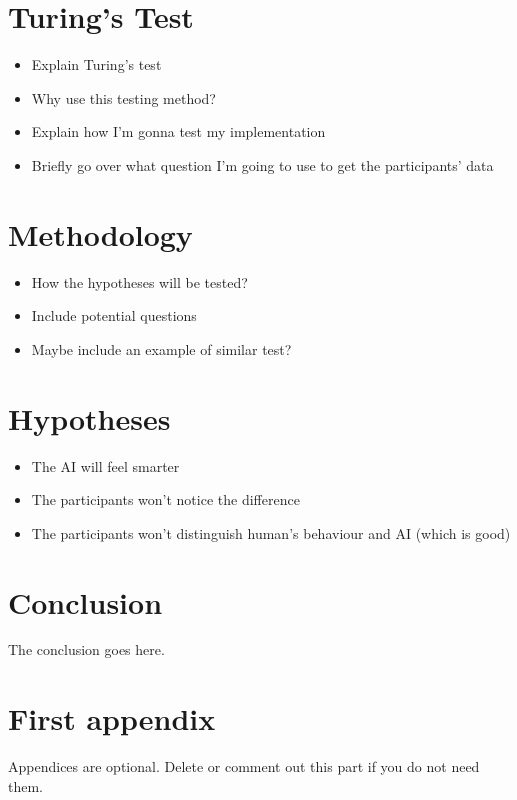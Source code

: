 \documentclass[journal]{IEEEtran}
\begin{document}
\section{Turing's Test}
\begin{itemize}
	\item Explain Turing's test
	\item Why use this testing method?
	\item Explain how I'm gonna test my implementation
	\item Briefly go over what question I'm going to use to get the participants' data
\end{itemize}

\section{Methodology}
\begin{itemize}
	\item How the hypotheses will be tested?
	\item Include potential questions
	\item Maybe include an example of similar test?
\end{itemize}

\section{Hypotheses}
\begin{itemize}
	\item The AI will feel smarter
	\item The participants won't notice the difference
	\item The participants won't distinguish human's behaviour and AI (which is good)
\end{itemize}

\section{Conclusion}
The conclusion goes here.






\appendices
\section{First appendix}
Appendices are optional. Delete or comment out this part if you do not need them.

\end{document}
